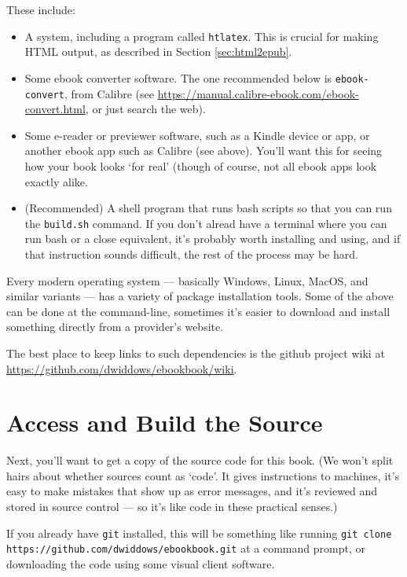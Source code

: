 These include:

\begin{itemize}
\item A \latex system, including a program called \texttt{htlatex}.
  This is crucial for making HTML output, as described in Section \ref{sec:html2epub}.
\item Some ebook converter software. The one recommended below is
  \texttt{ebook-convert}, from Calibre (see
  \url{https://manual.calibre-ebook.com/ebook-convert.html}, or just
  search the web).
\item Some e-reader or previewer software, such as a Kindle device or
  app, or another ebook app such as Calibre (see above). You'll want
  this for seeing how your book looks `for real' (though of course,
  not all ebook apps look exactly alike.
\item (Recommended) A shell program that runs bash scripts so that you
  can run the \texttt{build.sh} command. If you don't alread have a
  terminal where you can run bash or a close equivalent, it's probably
  worth installing and using, and if that instruction sounds
  difficult, the rest of the process may be hard.
\end{itemize}

Every modern operating system --- basically Windows, Linux, MacOS, and
similar variants --- has a variety of package installation tools.
Some of the above can be done at the command-line, sometimes it's
easier to download and install something directly from a provider's
website.

The best place to keep links to such dependencies is the 
github project wiki at \url{https://github.com/dwiddows/ebookbook/wiki}.

\section{Access and Build the \latex Source}

Next, you'll want to get a copy of the source code for this
book. (We won't split hairs about whether \latex sources count as
`code'. It gives instructions to machines, it's easy to make mistakes
that show up as error messages, and it's reviewed and stored in source
control --- so it's like code in these practical senses.)

If you already have \texttt{git} installed, this will be something
like running \texttt{git clone
  https://github.com/dwiddows/ebookbook.git} at a command prompt, or
downloading the code using some visual client software. 

